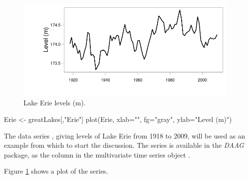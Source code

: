\begin{figure}
\begin{Schunk}


\centerline{\includegraphics[width=0.98\textwidth]{figs/9-Erie1-1} }

\end{Schunk}
\caption{Lake Erie levels (m).
}\label{fig:erie}
\end{figure}
\begin{marginfigure}[-7cm]
\begin{Schunk}
\begin{Sinput}
Erie <- greatLakes[,"Erie"]
plot(Erie, xlab="", fg="gray",
     ylab="Level (m)")
\end{Sinput}
\end{Schunk}
\end{marginfigure}

The data series , giving levels of Lake Erie
from 1918 to 2009, will be used as an example from which
to start the discussion.
    The series is available in the
    \textit{DAAG} package, as the column  in the
    multivariate time series object .

Figure \ref{fig:erie} shows a plot of the series.


